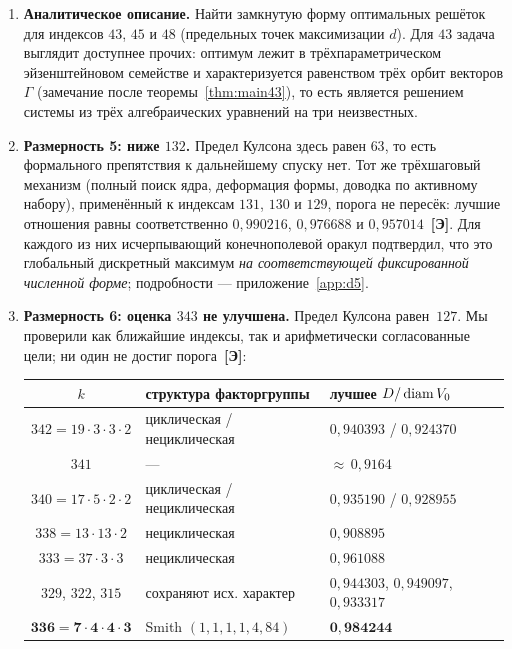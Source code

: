 \begin{enumerate}[leftmargin=1.5em]
Как и прежде, всё сказанное --- \emph{не} доказательство минимальности:
нижняя граница Кулсона $\chi_s\ge2^{n+1}-1=31$ \cite{Coulson,ABPR}
формального препятствия не даёт, а только что описанная история $45\to43$ --- второй после индекса
$134$ в $\R^5$ случай, когда <<экран>> снимался переходом в другую область, а
не уточнением прежней. Строгое доказательство минимальности (или конструкция
с $31\le k\le42$) --- открытая задача в духе вопроса~1 из \cite{ABPR}.
\item \textbf{Аналитическое описание.} Найти замкнутую форму оптимальных
решёток для индексов $43$, $45$ и $48$ (предельных точек максимизации $d$).
Для $43$ задача выглядит доступнее прочих: оптимум лежит в
трёхпараметрическом эйзенштейновом семействе и характеризуется равенством
трёх орбит векторов $\Gamma$ (замечание после теоремы~\ref{thm:main43}), то
есть является решением системы из трёх алгебраических уравнений на три
неизвестных.
\item \textbf{Размерность 5: ниже $132$.} Предел Кулсона здесь равен $63$, то
есть формального препятствия к дальнейшему спуску нет. Тот же трёхшаговый
механизм (полный поиск ядра, деформация формы, доводка по активному набору),
применённый к индексам $131$, $130$ и $129$, порога не пересёк: лучшие
отношения равны соответственно $0{,}990216$, $0{,}976688$ и
$0{,}957014$~\textbf{[Э]}. Для каждого из них исчерпывающий конечнополевой
оракул подтвердил, что это глобальный дискретный максимум \emph{на
соответствующей фиксированной численной форме}; подробности ---
приложение~\ref{app:d5}.

\item \textbf{Размерность 6: оценка $343$ не улучшена.} Предел Кулсона
равен~$127$. Мы проверили как ближайшие индексы, так и арифметически
согласованные цели; ни один не достиг порога~\textbf{[Э]}:

\smallskip
\begin{center}\small
\begin{tabular}{c l l}
\toprule
$k$ & структура факторгруппы & лучшее $D/\operatorname{diam} V_0$\\
\midrule
$342=19\cdot3\cdot3\cdot2$ & циклическая / нециклическая & $0{,}940393$ / $0{,}924370$\\
$341$ & --- & ${\approx}\,0{,}9164$\\
$340=17\cdot5\cdot2\cdot2$ & циклическая / нециклическая & $0{,}935190$ / $0{,}928955$\\
$338=13\cdot13\cdot2$ & нециклическая & $0{,}908895$\\
$333=37\cdot3\cdot3$ & нециклическая & $0{,}961088$\\
$329$, $322$, $315$ & сохраняют исх. характер & $0{,}944303$, $0{,}949097$, $0{,}933317$\\
$\mathbf{336=7\cdot4\cdot4\cdot3}$ & Smith $(1,1,1,1,4,84)$ & $\mathbf{0{,}984244}$\\
\bottomrule
\end{tabular}
\end{center}
\smallskip


\end{enumerate}

